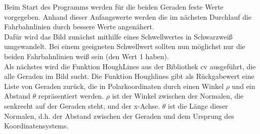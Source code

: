 \documentclass[a4paper,12pt]{article}
\begin{document}
	
	
	
	
	Beim Start des Programms werden für die beiden Geraden feste Werte vorgegeben. Anhand dieser Anfangswerte werden die im nächsten Durchlauf die Fahrbahnlinien durch bessere Werte angenähert.\\
	Dafür wird das Bild zunächst mithilfe eines Schwellwertes in Schwarzweiß umgewandelt. Bei einem geeigneten Schwellwert sollten nun möglichst nur die beiden Fahrbahnlinien weiß sein (den Wert 1 haben).\\
	Als nächstes wird die Funktion HoughLines aus der Bibliothek cv ausgeführt, die alle Geraden im Bild sucht. Die Funktion Houghlines gibt als Rückgabewert eine Liste von Geraden zurück, die in Polarkoordinaten durch einen Winkel $\rho$ und ein Abstand $\theta$ repräsentiert werden. $\rho$ ist der Winkel zwischen der Normalen, die senkrecht auf der Geraden steht, und der x-Achse. $\theta$ ist die Länge dieser Normalen, d.h. der Abstand zwischen der Geraden und dem Ursprung des Koordinatensystems.
	
 
	
	


\end{document}
